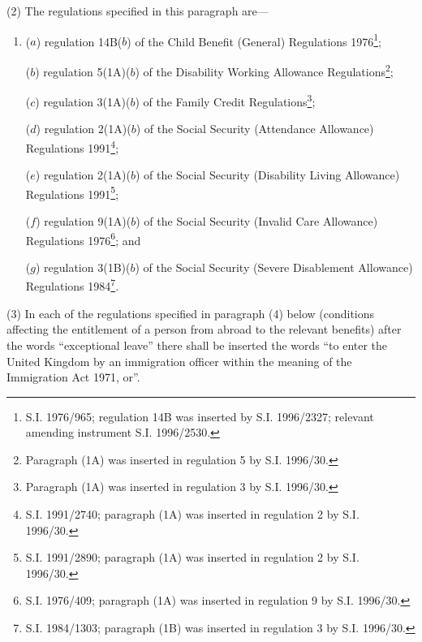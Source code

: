 \documentclass[12pt,a4paper]{article}
\begin{document}
(2) The regulations specified in this paragraph are—
\begin{enumerate}\item[]
($a$) regulation 14B($b$)  of the Child Benefit (General) Regulations 1976\footnote{\frenchspacing S.I. 1976/965; regulation 14B was inserted by S.I. 1996/2327; relevant amending instrument S.I. 1996/2530.};

($b$) regulation 5(1A)($b$)  of the Disability Working Allowance Regulations\footnote{\frenchspacing Paragraph (1A) was inserted in regulation 5 by S.I. 1996/30.};

($c$) regulation 3(1A)($b$)  of the Family Credit Regulations\footnote{\frenchspacing Paragraph (1A) was inserted in regulation 3 by S.I. 1996/30.};

($d$) regulation 2(1A)($b$)  of the Social Security (Attendance Allowance) Regulations 1991\footnote{\frenchspacing S.I. 1991/2740; paragraph (1A) was inserted in regulation 2 by S.I. 1996/30.};

($e$) regulation 2(1A)($b$)  of the Social Security (Disability Living Allowance) Regulations 1991\footnote{\frenchspacing S.I. 1991/2890; paragraph (1A) was inserted in regulation 2 by S.I. 1996/30.};

($f$) regulation 9(1A)($b$)  of the Social Security (Invalid Care Allowance) Regulations 1976\footnote{\frenchspacing S.I. 1976/409; paragraph (1A) was inserted in regulation 9 by S.I. 1996/30.}; and

($g$) regulation 3(1B)($b$)  of the Social Security (Severe Disablement Allowance) Regulations 1984\footnote{\frenchspacing S.I. 1984/1303; paragraph (1B) was inserted in regulation 3 by S.I. 1996/30.}.
\end{enumerate}

(3) In each of the regulations specified in paragraph (4) below (conditions affecting the entitlement of a person from abroad to the relevant benefits) after the words “exceptional leave” there shall be inserted the words “to enter the United Kingdom by an immigration officer within the meaning of the Immigration Act 1971, or”.
\end{document}
